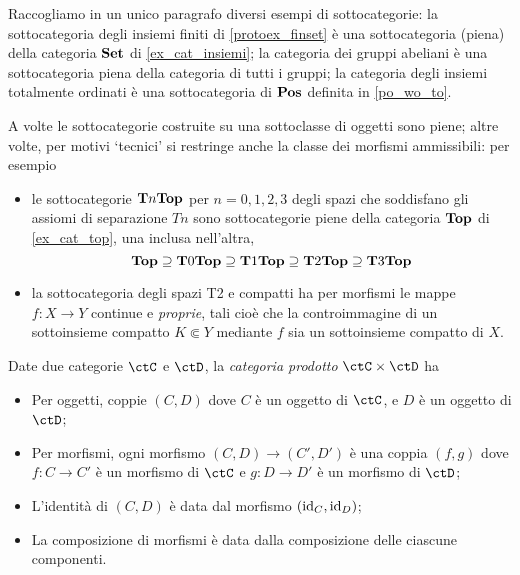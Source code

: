 \begin{example}
	Raccogliamo in un unico paragrafo diversi esempi di sottocategorie: la sottocategoria degli insiemi finiti di \ref{protoex_finset} è una sottocategoria (piena) della categoria \(\mathbf{Set}\) di \ref{ex_cat_insiemi}; la categoria dei gruppi abeliani è una sottocategoria piena della categoria di tutti i gruppi; la categoria degli insiemi totalmente ordinati è una sottocategoria di \(\mathbf{Pos}\) definita in \ref{po_wo_to}.

	A volte le sottocategorie costruite su una sottoclasse di oggetti sono piene; altre volte, per motivi `tecnici' si restringe anche la classe dei morfismi ammissibili: per esempio
	\begin{itemize}
		\item le sottocategorie \(\mathbf{T}n\mathbf{Top}\) per \(n=0,1,2,3\) degli spazi che soddisfano gli assiomi di separazione \(Tn\) sono sottocategorie piene della categoria \(\mathbf{Top}\) di \ref{ex_cat_top}, una inclusa nell'altra,
		      \[\mathbf{Top}\supseteq\mathbf{T}0\mathbf{Top}\supseteq\mathbf{T}1\mathbf{Top}\supseteq\mathbf{T}2\mathbf{Top}\supseteq\mathbf{T}3\mathbf{Top}\]
		\item la sottocategoria degli spazi T2 e compatti ha per morfismi le mappe \(f : X\to Y\) continue e \emph{proprie}, tali cioè che la controimmagine di un sottoinsieme compatto \(K\Subset Y\) mediante \(f\) sia un sottoinsieme compatto di \(X\).
	\end{itemize}
\end{example}
\begin{definition}\label{def_cat_prodotto}
	Date due categorie \(\ctC\) e \(\ctD\), la \emph{categoria prodotto} \(\ctC\times\ctD\) ha
	\begin{itemize}
		\item Per oggetti, coppie \((C,D)\) dove \(C\) è un oggetto di \(\ctC\), e \(D\) è un oggetto di \(\ctD\);
		\item Per morfismi, ogni morfismo \((C,D)\to(C',D')\) è una coppia \((f,g)\) dove \(f:C\to C'\) è un morfismo di \(\ctC\) e \(g:D\to D'\) è un morfismo di \(\ctD\);
		\item L'identità di \((C,D)\) è data dal morfismo \((\mathrm{id}_C,\mathrm{id}_D)\);
		\item La composizione di morfismi è data dalla composizione delle ciascune componenti.
	\end{itemize}
\end{definition}
